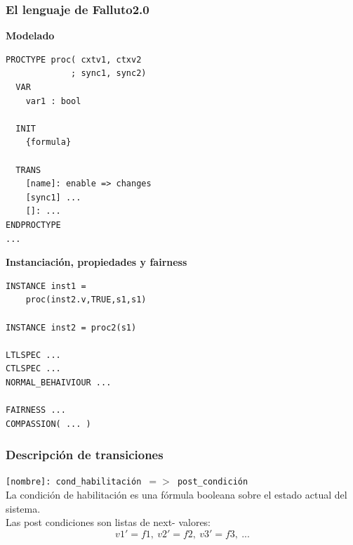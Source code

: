 \documentclass[serif]{beamer}
\begin{document}
\begin{frame}[fragile]
\frametitle{El lenguaje de Falluto2.0}
{\fontsize{8pt}{10pt}\selectfont
\begin{minipage}{0.5\textwidth}
{\large \bfseries Modelado}
\begin{framed} 
\begin{verbatim}
PROCTYPE proc( cxtv1, ctxv2 
             ; sync1, sync2)
  VAR
    var1 : bool
   
  INIT
    {formula}

  TRANS
    [name]: enable => changes
    [sync1] ...
    []: ...
ENDPROCTYPE
...
\end{verbatim}
\end{framed}
\end{minipage}
\hspace{0.04\textwidth}
\begin{minipage}{0.44\textwidth}
{\large \bfseries Instanciación, propiedades y fairness}
\begin{framed}
\begin{verbatim}
INSTANCE inst1 =
    proc(inst2.v,TRUE,s1,s1)

INSTANCE inst2 = proc2(s1)

LTLSPEC ...
CTLSPEC ...
NORMAL_BEHAIVIOUR ...

FAIRNESS ...
COMPASSION( ... )

\end{verbatim}
\end{framed}
\end{minipage}
} %

\end{frame}



\begin{frame}
\frametitle{Descripción de transiciones}
\texttt{[nombre]: cond\_habilitación $=>$ post\_condición}\\[0.5cm]
La condición de habilitación es una fórmula
booleana sobre el estado actual del sistema.\\[0.5cm]
Las post condiciones son listas de next-
valores: $$v1' = f1,~v2' = f2,~v3' = f3,~...$$
\end{frame}
\end{document}
